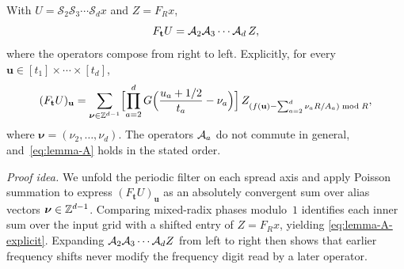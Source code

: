 \begin{lemma}\label{lem:bridge-A}
With $U=\mathcal S_2\mathcal S_3\cdots\mathcal S_d x$ and $Z=F_R x$,
\begin{equation}\label{eq:lemma-A}
  F_{\mathbf t}U=\mathcal{A}_2\mathcal{A}_3\cdots\mathcal{A}_d\,Z,
\end{equation}
where the operators compose from right to left. Explicitly, for every $\mathbf u\in[t_1]\times\cdots\times[t_d]$,
\begin{equation}\label{eq:lemma-A-explicit}
  (F_{\mathbf t}U)_{\mathbf u}=\sum_{\boldsymbol\nu\in\mathbb{Z}^{d-1}}
  \Bigl[\prod_{a=2}^d G\Bigl(\frac{u_a+1/2}{t_a}-\nu_a\Bigr)\Bigr]\,
  Z_{(f(\mathbf u)-\sum_{a=2}^d\nu_a R/A_a)\bmod R},
\end{equation}
where $\boldsymbol\nu=(\nu_2,\dots,\nu_d)$. The operators $\mathcal{A}_a$ do not commute in general, and~\eqref{eq:lemma-A}
holds in the stated order.
\end{lemma}

\emph{Proof idea.} We unfold the periodic filter on each spread axis and apply Poisson summation to express
$(F_{\mathbf t}U)_{\mathbf u}$ as an absolutely convergent sum over alias vectors $\boldsymbol\nu\in\mathbb{Z}^{d-1}$. Comparing
mixed-radix phases modulo~$1$ identifies each inner sum over the input grid with a shifted entry of $Z=F_R x$, yielding
\eqref{eq:lemma-A-explicit}. Expanding $\mathcal{A}_2\mathcal{A}_3\cdots\mathcal{A}_d Z$ from left to right then shows that earlier frequency
shifts never modify the frequency digit read by a later operator.

